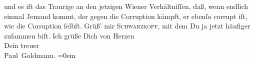 \begin{ledgroupsized}[t]{13cm}
               und es iſt das Traurige an den jetzigen Wiener Verhältniſſen, daß, wenn endlich einmal
               Jemand kommt, der gegen die Corruption kämpft, er ebenſo corrupt iſt, wie die
               Corruption ſelbſt.\pend
           \pstart
           Grüß’ mir \textsc{Schwarzkopf}, mit dem Du ja jetzt häufiger zuſammen biſt.\pend
           \pstart
           Ich grüße Dich von Herzen {\\[\baselineskip]}Dein treuer {\\[\baselineskip]}\spacefill\mbox{Paul Goldmann.}\pend
           \leftskip=0em{}
         
         \endnumbering{}\end{ledgroupsized}  \newcommand{\dateiname}{L02876}\newcommand{\titel}{Paul Goldmann an Arthur Schnitzler, 28. 5. [1899]}\newcommand{\editorInnen}{Martin Anton Müller und Laura Untner}
      